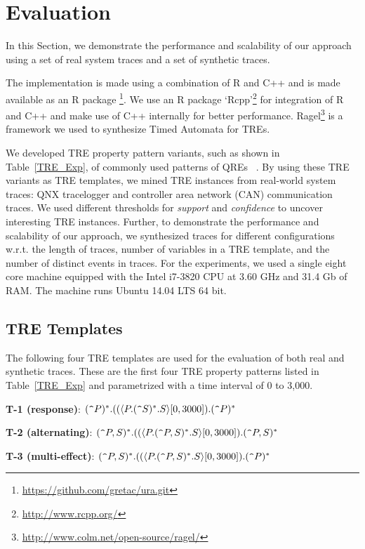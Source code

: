 \documentclass[]{sigplanconf}
\begin{document}
\section{Evaluation}

In this Section, we demonstrate the performance and scalability of our approach using a set of real system traces and a set of synthetic traces.

The implementation is made using a combination of R and C++ and is made available as an R package \footnote{\url{https://github.com/gretac/ura.git}}. We use an R package `Rcpp'\footnote{\url{http://www.rcpp.org/}} for integration of R and C++ and make use of C++ internally for better performance. Ragel\footnote{\url{http://www.colm.net/open-source/ragel/}} is a framework we used to synthesize Timed Automata for TREs.

We developed TRE property pattern variants, such as shown in Table~\ref{TRE_Exp}, of commonly used patterns of QREs ~\cite{DBLP:conf/paste/YangE04}. By using these TRE variants as TRE templates, we mined TRE instances from real-world system traces: QNX tracelogger and controller area network (CAN) communication traces. We used different thresholds for \emph{support} and \emph{confidence} to uncover interesting TRE instances. Further, to demonstrate the performance and scalability of our approach, we synthesized traces for different configurations w.r.t. the length of traces, number of variables in a TRE template, and the number of distinct events in traces. For the experiments, we used a single eight core machine equipped with the Intel i7-3820 CPU at 3.60 GHz and 31.4 Gb of RAM. The machine runs Ubuntu 14.04 LTS 64 bit.

\subsection{TRE Templates}
The following four TRE templates are used for the evaluation of both real and synthetic traces. These are the first four TRE property patterns listed in Table~\ref{TRE_Exp} and parametrized with a time interval of 0 to 3,000.
\vspace{2mm}

\noindent \textbf{T-1 (response)}: $(\verb!^!P)^*.((\langle P.(\verb!^!S)^*.S\rangle[0, 3000]).(\verb!^!P)^*$

\noindent \textbf{T-2 (alternating)}: $(\verb!^!P,S)^*.((\langle P.(\verb!^!P,S)^*.S\rangle[0, 3000]).(\verb!^!P,S)^*$

\noindent \textbf{T-3 (multi-effect)}: $(\verb!^!P,S)^*.((\langle P.(\verb!^!P,S)^*.S\rangle[0, 3000]).(\verb!^!P)^*$
\end{document}
